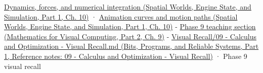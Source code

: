 \hypertarget{appendix-18eacf61a04b-full-teaching-explanation}{}

\href{../05-Spatial-Worlds-Engine-State-and-Simulation-P01/main.pdf\#nameddest=04-visual-computing-ii-ch029-dynamics-forces-and-numerical-integration}{Dynamics, forces, and numerical integration (Spatial Worlds, Engine State, and Simulation, Part 1, Ch. 10)} · \href{../05-Spatial-Worlds-Engine-State-and-Simulation-P01/main.pdf\#nameddest=04-visual-computing-ii-ch029-animation-curves-and-motion-paths}{Animation curves and motion paths (Spatial Worlds, Engine State, and Simulation, Part 1, Ch. 10)} - \href{../02-Mathematics-for-Visual-Computing-P02/main.pdf\#nameddest=02-foundations-ii-ch025-odes-and-numerical-simulation}{Phase 9 teaching section (Mathematics for Visual Computing, Part 2, Ch. 9)} - \href{../01-Bits-Programs-and-Reliable-Systems-P01/main.pdf\#nameddest=appendix-adf48f5dc5c1}{Visual Recall/09 - Calculus and Optimization - Visual Recall.md (Bits, Programs, and Reliable Systems, Part 1, Reference notes: 09 - Calculus and Optimization - Visual Recall)} · Phase 9 visual recall
